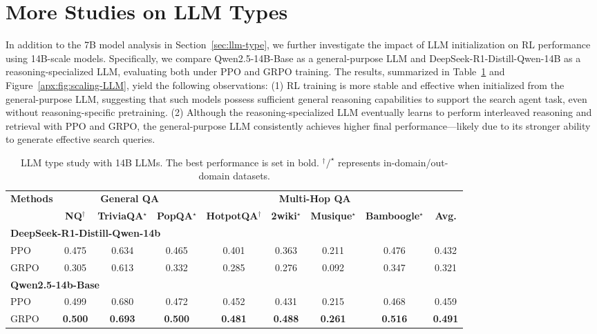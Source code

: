 \section{More Studies on LLM Types}\label{apx:sec:llm-type}

In addition to the 7B model analysis in Section~\ref{sec:llm-type}, we further investigate the impact of LLM initialization on RL performance using 14B-scale models. Specifically, we compare Qwen2.5-14B-Base as a general-purpose LLM and DeepSeek-R1-Distill-Qwen-14B as a reasoning-specialized LLM, evaluating both under PPO and GRPO training. The results, summarized in Table~\ref{apx:tab:llm-type} and Figure~\ref{apx:fig:scaling-LLM}, yield the following observations:
(1) RL training is more stable and effective when initialized from the general-purpose LLM, suggesting that such models possess sufficient general reasoning capabilities to support the search agent task, even without reasoning-specific pretraining.
(2) Although the reasoning-specialized LLM eventually learns to perform interleaved reasoning and retrieval with PPO and GRPO, the general-purpose LLM consistently achieves higher final performance—likely due to its stronger ability to generate effective search queries.

\begin{table}[h]
    \centering
    \scriptsize
    \setlength{\tabcolsep}{4pt}
    
    \caption{LLM type study with 14B LLMs. The best performance is set in bold. $^\dagger/^\star$ represents in-domain/out-domain datasets.}\label{apx:tab:llm-type}
    \begin{tabular}{lcccccccc}
        \toprule
        \textbf{Methods} & \multicolumn{3}{c}{\textbf{General QA}} & \multicolumn{4}{c}{\textbf{Multi-Hop QA}} \\
        
        \cmidrule(lr){2-4} \cmidrule(lr){5-8}
         & \textbf{NQ$^\dagger$} & \textbf{TriviaQA$^\star$} & \textbf{PopQA$^\star$} & \textbf{HotpotQA$^\dagger$} & \textbf{2wiki$^\star$} & \textbf{Musique$^\star$} & \textbf{Bamboogle$^\star$} & \textbf{Avg.} \\
        \midrule
        \multicolumn{9}{l}{\textbf{DeepSeek-R1-Distill-Qwen-14b}} \\
        \hdashline
        PPO & 0.475 & 0.634 & 0.465 & 0.401 & 0.363 & 0.211 & 0.476	& 0.432  \\
        
        GRPO & 0.305 & 0.613 & 0.332 & 0.285 & 0.276 & 0.092 & 0.347 & 0.321  \\
        \midrule
        \multicolumn{9}{l}{\textbf{Qwen2.5-14b-Base}} \\
        \hdashline
        PPO & 0.499 & 0.680 & 0.472 & 0.452 & 0.431 & 0.215 & 0.468 & 0.459 \\
        
        GRPO &  \textbf{0.500} & \textbf{0.693} & \textbf{0.500} & \textbf{0.481} & \textbf{0.488} & \textbf{0.261} & \textbf{0.516} & \textbf{0.491}  \\
        \bottomrule
    \end{tabular}
\end{table}

